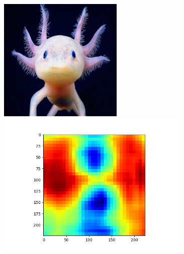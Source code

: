 \includegraphics[width=2.33333in]{./hw2/out.jpg}
\includegraphics[width=3.64583in]{./hw2/axolotl.jpg.heatmap.png}
